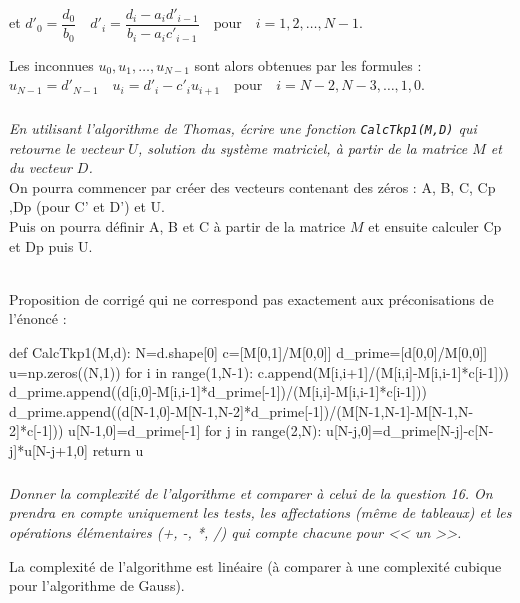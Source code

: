 \documentclass[10pt,fleqn]{article} %
\begin{document}
\begin{multicols}{2}
et $
d'_0 = \dfrac{d_0}{b_0} \quad d'_i = \dfrac{d_i-a_i d'_{i-1}}{b_i - a_i c'_{i-1}}  \quad \text{pour} \quad i=1,2,\ldots, N-1.
$

Les inconnues $u_0, u_1, \ldots, u_{N-1}$ sont alors obtenues par les formules :
$
u_{N-1} = d'_{N-1} \quad u_i = d'_i -c'_i u_{i+1} \quad  \text{pour} \quad i=N-2, N-3, \ldots, 1, 0.
$

\fi

\subparagraph{}
\textit{En utilisant l'algorithme de Thomas, écrire une fonction \texttt{CalcTkp1(M,D)} 
qui retourne le vecteur $U$, solution du système matriciel, à partir de la matrice 
$M$ et du vecteur $D$.}\\

On pourra commencer par créer  des vecteurs contenant des zéros :
 A, B, C, Cp ,Dp (pour C' et D') et U.\\
 Puis on pourra  définir A, B et C à partir de la matrice $M$ et ensuite calculer Cp et Dp puis U.

\ifprof
\begin{corrige}
~\\
Proposition de corrigé qui ne correspond pas exactement aux préconisations de l'énoncé :

\begin{python}
def CalcTkp1(M,d):
    N=d.shape[0]
    c=[M[0,1]/M[0,0]]
    d_prime=[d[0,0]/M[0,0]]
    u=np.zeros((N,1))
    for i in range(1,N-1):
        c.append(M[i,i+1]/(M[i,i]-M[i,i-1]*c[i-1]))
        d_prime.append((d[i,0]-M[i,i-1]*d_prime[-1])/(M[i,i]-M[i,i-1]*c[i-1]))
    d_prime.append((d[N-1,0]-M[N-1,N-2]*d_prime[-1])/(M[N-1,N-1]-M[N-1,N-2]*c[-1]))
    u[N-1,0]=d_prime[-1]
    for j in range(2,N):
        u[N-j,0]=d_prime[N-j]-c[N-j]*u[N-j+1,0]
    return u
\end{python}
\end{corrige}
\else
\fi

\subparagraph{}
\textit{Donner la complexité de l'algorithme et comparer à celui de la question 16. 
On prendra en compte uniquement les tests, les affectations (même de tableaux)
 et les opérations élémentaires (+, -, *, /) qui compte chacune pour << un >>.}\\

\ifprof
\begin{corrige}
La complexité de l'algorithme est linéaire (à comparer à une complexité cubique pour l'algorithme de Gauss).
\end{corrige}
\else
\fi



\end{multicols}
\end{document}
